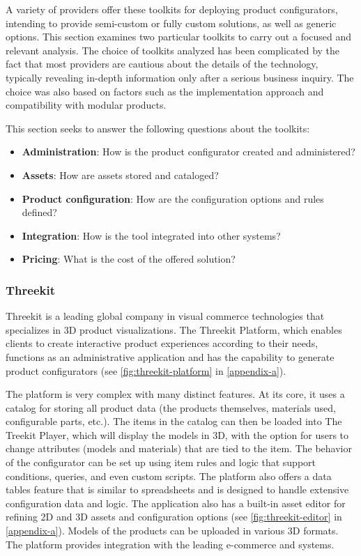 A variety of providers offer these toolkits for deploying product configurators, intending to provide semi-custom or fully custom solutions, as well as generic options. This section examines two particular toolkits to carry out a focused and relevant analysis. The choice of toolkits analyzed has been complicated by the fact that most providers are cautious about the details of the technology, typically revealing in-depth information only after a serious business inquiry. The choice was also based on factors such as the implementation approach and compatibility with modular products.

\noindent This section seeks to answer the following questions about the toolkits: 
\begin{itemize}[label=\rectanglebullet]
    \item \textbf{Administration}: How is the product configurator created and administered?
    \item \textbf{Assets}: How are assets stored and cataloged?
    \item \textbf{Product configuration}: How are the configuration options and rules defined?
    \item \textbf{Integration}: How is the tool integrated into other systems?
    \item \textbf{Pricing}: What is the cost of the offered solution?
\end{itemize}


\subsubsection{Threekit}

Threekit is a leading global company in visual commerce technologies that specializes in 3D product visualizations. The Threekit Platform, which enables clients to create interactive product experiences according to their needs, functions as an administrative application and has the capability to generate product configurators (see \autoref{fig:threekit-platform} in \autoref{appendix-a}).~\cite{ThreeKitAboutUs, ThreeKitPlatform}

The platform is very complex with many distinct features. At its core, it uses a catalog for storing all product data (the products themselves, materials used, configurable parts, etc.). The items in the catalog can then be loaded into The Treekit Player, which will display the models in 3D, with the option for users to change attributes (models and materials) that are tied to the item. The behavior of the configurator can be set up using item rules and logic that support conditions, queries, and even custom scripts. The platform also offers a data tables feature that is similar to spreadsheets and is designed to handle extensive configuration data and logic. The application also has a built-in asset editor for refining 2D and 3D assets and configuration options (see \autoref{fig:threekit-editor} in \autoref{appendix-a}). Models of the products can be uploaded in various 3D formats. The platform provides  integration with the leading e-commerce and  systems.~\cite{ThreeKitPlatformDocumentation}

